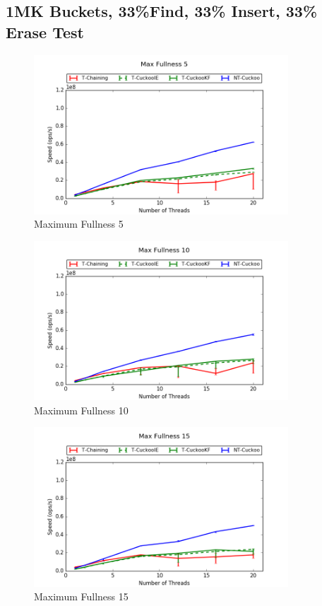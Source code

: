 \subsection{1MK Buckets, 33\%Find, 33\% Insert, 33\% Erase Test}
\begin{figure}[H]
    \centering
	\includegraphics[width=0.85\textwidth]{maps/5HM1M:F34,I33,E33.png} 
        \caption*{Maximum Fullness 5}
\end{figure}
\begin{figure}[H]
    \centering
	\includegraphics[width=0.85\textwidth]{maps/10HM1M:F34,I33,E33.png} 
        \caption*{Maximum Fullness 10}
\end{figure}
\begin{figure}[H]
    \centering
	\includegraphics[width=0.85\textwidth]{maps/15HM1M:F34,I33,E33.png} 
        \caption*{Maximum Fullness 15}
\end{figure}


